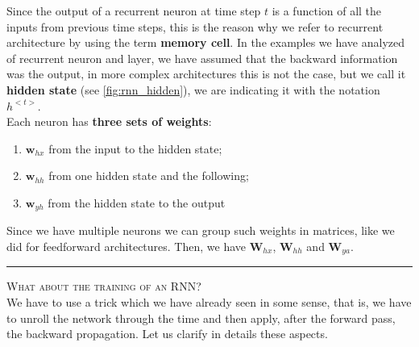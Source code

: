 Since the output of a recurrent neuron at time step $t$ is a function of all the inputs from previous time steps, this is the reason why we refer to recurrent architecture by using the term \textbf{memory cell}. In the examples we have analyzed of recurrent neuron and layer, we have assumed that the backward information was the output, in more complex architectures this is not the case, but we call it \textbf{hidden state} (see \cref{fig:rnn_hidden}), we are indicating it with the notation $h^{<t>}$.\\
Each neuron has \textbf{three sets of weights}: 
\begin{enumerate}
    \itemsep-0.2em
    \item $\mathbf{w}_{hx}$ from the input to the hidden state; 
    \item $\mathbf{w}_{hh}$ from one hidden state and the following; 
    \item $\mathbf{w}_{yh}$ from the hidden state to the output
\end{enumerate} 
Since we have multiple neurons we can group such weights in matrices, like we did for feedforward architectures. Then, we have $\mathbf{W}_{hx}$, $\mathbf{W}_{hh}$ and $\mathbf{W}_{ya}$. \\

\hrule
\vspace{0.2cm}
\noindent
\textsc{\large What about the training of an RNN?}\\
 We have to use a trick which we have already  seen in some sense, that is, we have to unroll the network through the time and then apply, after the forward pass, the backward propagation. Let us clarify in details these aspects.

